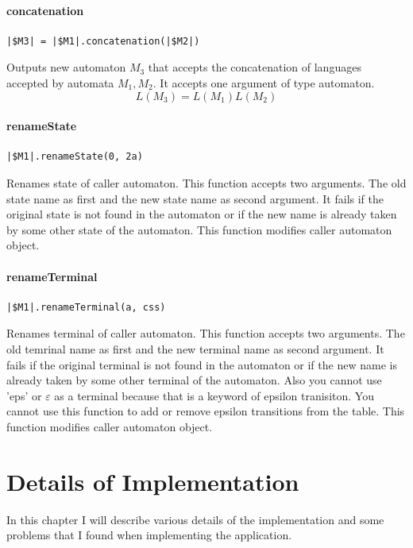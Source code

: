\documentclass{ctuthesis}
\begin{document}
\subsubsection{concatenation}
\begin{lstlisting}[language = JASL_snippet]
	|$M3| = |$M1|.concatenation(|$M2|)
\end{lstlisting}

Outputs new automaton $M_3$ that accepts the concatenation of languages accepted by automata $M_1, M_2$. It accepts one argument of type automaton.
\begin{equation*}
	L(M_3) = L(M_1)L(M_2)
\end{equation*}


\subsubsection{renameState}
\begin{lstlisting}[language = JASL_snippet]
	|$M1|.renameState(0, 2a)
\end{lstlisting}

Renames state of caller automaton. This function accepts two arguments. The old state name as first and the new state name as second argument. It fails if the original state is not found in the automaton or if the new name is already taken by some other state of the automaton. This function modifies caller automaton object.


\subsubsection{renameTerminal}
 \begin{lstlisting}[language = JASL_snippet]
	|$M1|.renameTerminal(a, css)
\end{lstlisting}

Renames terminal of caller automaton. This function accepts two arguments. The old temrinal name as first and the new terminal name as second argument. It fails if the original terminal is not found in the automaton or if the new name is already taken by some other terminal of the automaton. Also you cannot use 'eps' or $\varepsilon$ as a terminal because that is a keyword of epsilon tranisiton. You cannot use this function to add or remove epsilon transitions from the table. This function modifies caller automaton object.

\chapter{Details of Implementation}
In this chapter I will describe various details of the implementation and some problems that I found when implementing the application.
\end{document}
